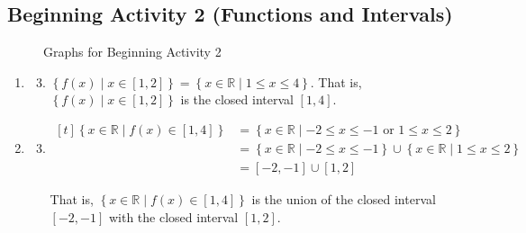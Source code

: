 \documentclass[11pt]{article}
\begin{document}
\hbreak%


\newpage
\subsection*{Beginning Activity 2 (Functions and Intervals)} 
\begin{figure}[h]
\begin{center}
\caption{Graphs for Beginning Activity 2}
\end{center}
\end{figure}
\begin{enumerate}
\item \begin{enumerate} \setcounter{enumii}{2}
\item $\left\{ f \left( x \right) \mid x \in \left[ 1, 2 \right] \right\} = 
\left\{ x \in \mathbb{R} \mid 1 \leq x \leq 4 \right\}$.  That is, 
$\left\{ f \left( x \right) \mid x \in \left[ 1, 2 \right] \right\}$ is the closed interval
$\left[ 1, 4 \right]$.
\end{enumerate}

\item \begin{enumerate} \setcounter{enumii}{2}
\item $\begin{aligned}[t]
\left\{ x \in \mathbb{R} \mid f \left( x \right) \in \left[ 1, 4 \right] \right\} &= 
\left\{ x \in \mathbb{R} \mid -2 \leq x \leq -1 \text{ or } 1 \leq x \leq 2 \right\} \\
 &= 
\left\{ x \in \mathbb{R} \mid -2 \leq x \leq -1 \right\} \cup \left\{x \in \mathbb{R} \mid  1 \leq x \leq 2 \right\} \\
&= \left[ -2, -1 \right] \cup \left[ 1, 2 \right]
\end{aligned}$

That is, $\left\{ x \in \mathbb{R} \mid f \left( x \right) \in \left[ 1, 4 \right] \right\}$ is the union of the closed interval $\left[ -2, -1 \right]$ with the closed interval  
$\left[ 1, 2 \right]$.
\end{enumerate}

\hbreak


\end{enumerate}
\end{document}
